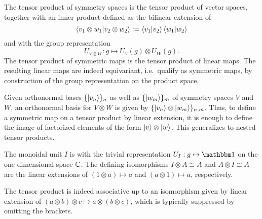 \begin{doublecol}
    The tensor product of symmetry spaces is the tensor product of vector spaces, together with an inner product defined as the bilinear extension of $$\braket{v_1 \otimes w_1}{v_2 \otimes w_2} := \braket{v_1}{v_2} \braket{w_1}{w_2}$$ and with the group representation $$U_{V \otimes W} : g \mapsto U_V(g) \otimes U_W(g).$$
    The tensor product of symmetric maps is the tensor product of linear maps.
    The resulting linear maps are indeed equivariant, i.e.~qualify as symmetric maps, by construction of the group representation on the product space.

    Given orthonormal bases $\set{\ket{v_n}}_n$ as well as $\set{\ket{w_m}}_m$ of symmetry spaces $V$ and $W$, an orthonormal basis for $V \otimes W$ is given by $\set{\ket{v_n} \otimes \ket{w_m}}_{n,m}$.
    Thus, to define a symmetric map on a tensor product by linear extension, it is enough to define the image of factorized elements of the form $\ket{v} \otimes \ket{w}$.
    This generalizes to nested tensor products.
    
    The monoidal unit $I$ is with the trivial representation $U_I: g \mapsto \eye$ on the one-di\-men\-sion\-al space $\mathbb{C}$.
    The defining isomorphisms $I \otimes A \cong A$ and $A \otimes I \cong A$ are the linear extensions of $(1 \otimes a) \mapsto a$ and $(a \otimes 1) \mapsto a$, respectively.
    
    The tensor product is indeed associative up to an isomorphism given by linear extension of $(a \otimes b) \otimes c \mapsto a \otimes (b \otimes c)$, which is typically suppressed by omitting the brackets.
    

\end{doublecol}
